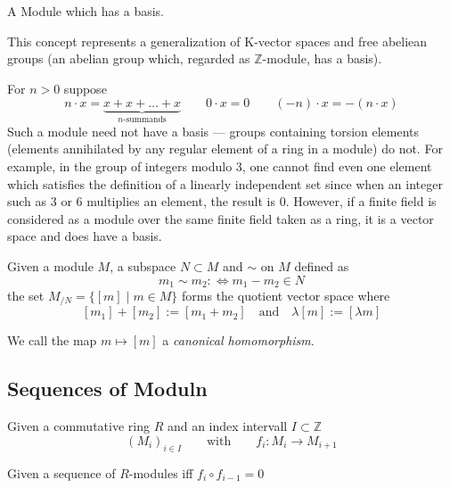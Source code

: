 \begin{definition}
   A Module which has a basis.
\end{definition}
\begin{remark}
   This concept represents a generalization of K-vector spaces and free abeliean groups (an abelian group which, regarded as \(\mathbb{Z}\)-module, has a basis).
\end{remark}
\begin{example}
   For \(n > 0\) suppose
   \[n \cdot x = \underbrace{x + x + \ldots + x}_{n\text{-summands}} \qquad 0 \cdot x = 0 \qquad (-n) \cdot x = -(n \cdot x)\]
   Such a module need not have a basis --- groups containing torsion elements (elements annihilated by any regular element of a ring in a module) do not.
   For example, in the group of integers modulo 3, one cannot find even one element which satisfies the definition of a linearly independent set since when an integer such as 3 or 6 multiplies an element, the result is 0.
   However, if a finite field is considered as a module over the same finite field taken as a ring, it is a vector space and does have a basis.
\end{example}

\begin{definition}
   Given a module \(M\), a subspace \(N \subset M\) and \(\sim\) on \(M\) defined as
   \[m_1 \sim m_2 :\iff m_1 - m_2 \in N\]
   the set \(M_{/N} = \{[m] \mid m \in M\}\) forms the quotient vector space where
   \[[m_1] + [m_2] := [m_1 + m_2] \quad\text{and}\quad \lambda [m] := [\lambda m]\]
\end{definition}
\begin{remark}
   We call the map \(m \mapsto [m]\) a \emph{canonical homomorphism}.
\end{remark}

\subsection{Sequences of Moduln}
\begin{definition}
   Given a commutative ring \(R\) and an index intervall \(I \subset \mathbb{Z}\)
   \[(M_i)_{i \in I} \qquad\text{with}\qquad f_i: M_i \to M_{i+1}\]
\end{definition}

\begin{definition}
   Given a sequence of \(R\)-modules iff \(f_i \circ f_{i-1} = 0\)
\end{definition}

